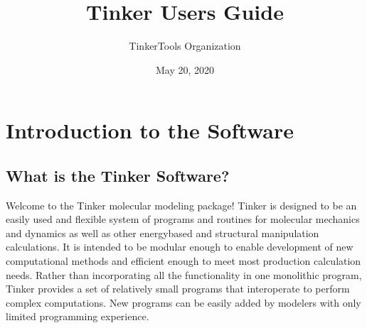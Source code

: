 \documentclass[letterpaper,11pt,english]{sphinxmanual}
\title{Tinker User\textquotesingle{}s Guide}
\date{May 20, 2020}
\author{TinkerTools Organization}
\begin{document}
\pagestyle{empty}
\sphinxmaketitle
\pagestyle{plain}
\sphinxtableofcontents
\pagestyle{normal}
\label{\detokenize{index::doc}}



\chapter{Introduction to the Software}
\label{\detokenize{text/introduction:introduction-to-the-software}}\label{\detokenize{text/introduction::doc}}

\section{What is the Tinker Software?}
\label{\detokenize{text/introduction:what-is-the-tinker-software}}
Welcome to the Tinker molecular modeling package! Tinker is designed to be an easily used and flexible system of programs and routines for molecular mechanics and dynamics as well as other energy\sphinxhyphen{}based and structural manipulation calculations. It is intended to be modular enough to enable development of new computational methods and efficient enough to meet most production calculation needs. Rather than incorporating all the functionality in one monolithic program, Tinker provides a set of relatively small programs that interoperate to perform complex computations. New programs can be easily added by modelers with only limited programming experience.
\end{document}
